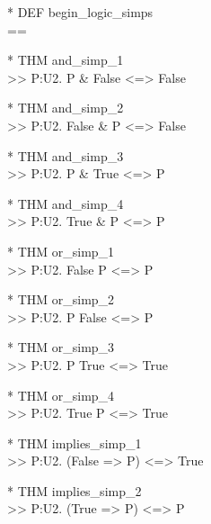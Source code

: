 \begin{prl*}
\>* DEF begin\_logic\_simps\\
\>  ==
\end{prl*}

\begin{prl*}
\>* THM and\_simp\_1\\
\>  >> \mforall{}P:U2. P \& False <=> False
\end{prl*}

\begin{prl*}
\>* THM and\_simp\_2\\
\>  >> \mforall{}P:U2. False \& P <=> False
\end{prl*}

\begin{prl*}
\>* THM and\_simp\_3\\
\>  >> \mforall{}P:U2. P \& True <=> P
\end{prl*}

\begin{prl*}
\>* THM and\_simp\_4\\
\>  >> \mforall{}P:U2. True \& P <=> P
\end{prl*}

\begin{prl*}
\>* THM or\_simp\_1\\
\>  >> \mforall{}P:U2. False \mvee{} P <=> P
\end{prl*}

\begin{prl*}
\>* THM or\_simp\_2\\
\>  >> \mforall{}P:U2. P \mvee{} False <=> P
\end{prl*}

\begin{prl*}
\>* THM or\_simp\_3\\
\>  >> \mforall{}P:U2. P \mvee{} True <=> True
\end{prl*}

\begin{prl*}
\>* THM or\_simp\_4\\
\>  >> \mforall{}P:U2. True \mvee{} P <=> True
\end{prl*}

\begin{prl*}
\>* THM implies\_simp\_1\\
\>  >> \mforall{}P:U2. (False => P) <=> True
\end{prl*}

\begin{prl*}
\>* THM implies\_simp\_2\\
\>  >> \mforall{}P:U2. (True => P) <=> P
\end{prl*}

